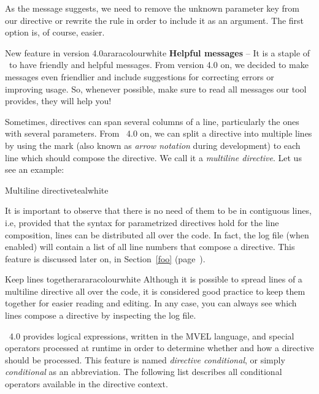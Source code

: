 As the message suggests, we need to remove the unknown parameter key from our directive or rewrite the rule in order to include it as an argument. The first option is, of course, easier.

\begin{messagebox}{New feature in version 4.0}{araracolour}{\icinfo}{white}
\textbf{Helpful messages} -- It is a staple of \arara\ to have friendly and helpful messages. From version 4.0 on, we decided to make messages even friendlier and include suggestions for correcting errors or improving usage. So, whenever possible, make sure to read all messages our tool provides, they will help you!
\end{messagebox}

Sometimes, directives can span several columns of a line, particularly the ones with several parameters. From \arara\ 4.0 on, we can split a directive into multiple lines by using the  mark (also known as \emph{arrow notation} during development) to each line which should compose the directive. We call it a \emph{multiline directive}. Let us see an example:

\begin{codebox}{Multiline directive}{teal}{\icnote}{white}
\end{codebox}

It is important to observe that there is no need of them to be in contiguous lines, i.e, provided that the syntax for parametrized directives hold for the line composition, lines can be distributed all over the code. In fact, the log file (when enabled) will contain a list of all line numbers that compose a directive. This feature is discussed later on, in Section~\ref{foo} (page~\pageref{foo}).

\begin{messagebox}{Keep lines together}{araracolour}{\icinfo}{white}
Although it is possible to spread lines of a multiline directive all over the code, it is considered good practice to keep them together for easier reading and editing. In any case, you can always see which lines compose a directive by inspecting the log file.
\end{messagebox}

\arara\ 4.0 provides logical expressions, written in the MVEL language, and special operators processed at runtime in order to determine whether and how a directive should be processed. This feature is named \emph{directive conditional}, or simply \emph{conditional} as an abbreviation. The following list describes all conditional operators available in the directive context.

